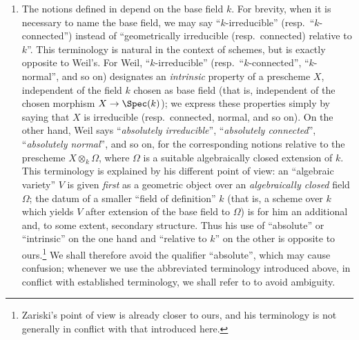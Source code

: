 \begin{remarks}[4.5.12]
\label{IV.4.5.12}
\begin{enumerate}
\item[\rm(i)]
\label{IV.4.5.12.i}
The notions defined in  depend on the base field $k$.
For brevity, when it is necessary to name the base field, we may say
``$k$-irreducible'' (resp.\ ``$k$-connected'') instead of
``geometrically irreducible (resp.\ connected) relative to $k$''.
This terminology is natural in the context of schemes, but is exactly
opposite to Weil's.
For Weil, ``$k$-irreducible'' (resp.\ ``$k$-connected'',
``$k$-normal'', and so on) designates an \emph{intrinsic} property of a
prescheme $X$, independent of the field $k$ chosen as base field
(that is, independent of the chosen morphism
$X\to\Spec(k)$); we express these properties simply by saying that
$X$ is irreducible (resp.\ connected, normal, and so on).
On the other hand, Weil says ``\emph{absolutely irreducible}'',
``\emph{absolutely connected}'', ``\emph{absolutely normal}'', and so on, for the
corresponding notions relative to the prescheme $X\otimes_k\Omega$, where $\Omega$
is a suitable algebraically closed extension of $k$.
This terminology is explained by his different point of view:
an ``algebraic variety'' $V$ is given \emph{first} as a geometric object over
an \emph{algebraically closed} field $\Omega$; the datum of a smaller
``field of definition'' $k$ (that is, a scheme over $k$ which yields
$V$ after extension of the base field to $\Omega$) is for him an additional
and, to some extent, secondary structure.
Thus his use of ``absolute'' or ``intrinsic'' on the one hand and
``relative to $k$'' on the other is opposite to ours.\footnote{Zariski's
point of view is already closer to ours, and his terminology is not
generally in conflict with that introduced here.}
We shall therefore avoid the qualifier ``absolute'', which may cause
confusion; whenever we use the abbreviated terminology introduced
above, in conflict with established terminology, we shall refer to
 to avoid ambiguity.


\end{enumerate}
\end{remarks}
